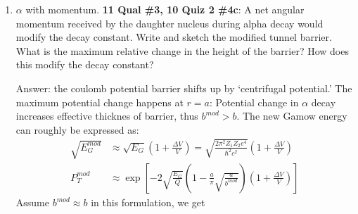\documentclass{school-22.101-notes}
\begin{document}
\begin{enumerate}
\item $\alpha$ with momentum. \textbf{11 Qual \#3, 10 Quiz 2 \#4c}: A net angular momentum received by the daughter nucleus during alpha decay would modify the decay constant. Write and sketch the modified tunnel barrier. What is the maximum relative change in the height of the barrier? How does this modify the decay constant? 

Answer: the coulomb potential barrier shifts up by `centrifugal potential.' The maximum potential change happens at $r = a$: 
 Potential change in $\alpha$ decay increases effective thicknes of barrier, thus $b^{mod} > b$. The new Gamow energy can roughly be expressed as: 
 \begin{align}
   \sqrt{E_G^{mod}} &\approx \sqrt{E_G} \left(1 + \frac{\Delta V}{V} \right)  = \sqrt{ \frac{2 \pi^2 Z_1 Z_2 e^4}{\hbar^2 c^2}}  \left(1 + \frac{\Delta V}{V} \right) \\
   P_T^{mod} &\approx \exp \left[ - 2 \sqrt{\frac{E_G}{Q}} \left( 1 - \frac{a}{\pi} \sqrt{\frac{a}{b^{mod}}} \right)  \left(1 + \frac{\Delta V}{V} \right)  \right] 
 \end{align}
Assume $b^{mod} \approx b$ in this formulation, we get 
\end{enumerate}
\end{document}
